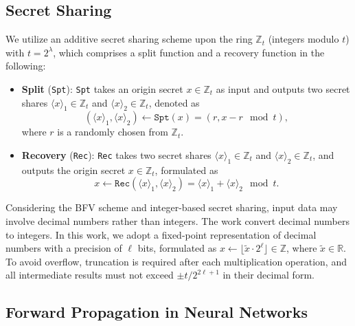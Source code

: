 \documentclass[conference]{IEEEtran}
\newcommand{\Spt}{\texttt{Spt}}
\newcommand{\Rec}{\texttt{Rec}}
\begin{document}
\subsection{Secret Sharing}\label{SS}
We utilize an additive secret sharing scheme upon the ring $\mathbb{Z}_t$ (integers modulo $t$) with $t = 2^\lambda$, which comprises a split function and a recovery function in the following:
\begin{itemize}
\item \textbf{Split} (\Spt): \texttt{Spt} takes an origin secret $x \in \mathbb{Z}_t$ as input and outputs two secret shares $\langle x \rangle_1 \in \mathbb{Z}_t$ and $\langle x \rangle_2 \in \mathbb{Z}_t$, denoted as
\begin{equation}
    (\langle x \rangle_1, \langle x \rangle_2) \gets \Spt(x) = (r, x - r\!\!\!\mod t),
\end{equation}
where $r$ is a randomly chosen from $\mathbb{Z}_t$.

\item \textbf{Recovery} (\Rec): \texttt{Rec} takes two secret shares $\langle x \rangle_1 \in \mathbb{Z}_t$ and $\langle x \rangle_2 \in \mathbb{Z}_t$, and outputs the origin secret $x \in \mathbb{Z}_t$, formulated as
\begin{equation}
     x \gets \Rec(\langle x \rangle_1, \langle x \rangle_2) = \langle x \rangle_1 + \langle x \rangle_2\!\!\!\mod t.
\end{equation}
\end{itemize}

Considering the BFV scheme and integer-based secret sharing, input data may involve decimal numbers rather than integers. The work \cite{liu2024pencilprivateextensiblecollaborative,8611203} convert decimal numbers to integers. In this work, we adopt a fixed-point representation of decimal numbers with a precision of $\ell$ bits, formulated as $x \gets \lfloor \tilde{x} \cdot 2^\ell \rfloor \in \mathbb{Z}$, where $\tilde{x} \in \mathbb{R}$. To avoid overflow, truncation is required after each multiplication operation, and all intermediate results must not exceed $\pm t/2^{2\ell + 1}$ in their decimal form.

\subsection{Forward Propagation in Neural Networks}
\end{document}
